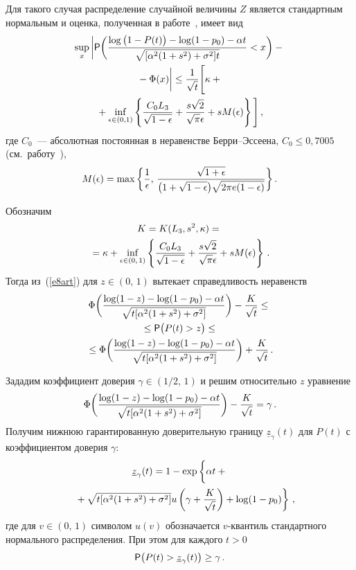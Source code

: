 \begin{multicols}{2}
Для такого случая распределение случайной величины $Z$ является
стандартным нормальным и оценка, полученная в работе~\cite{10art}, имеет
вид
\begin{multline}
\sup_x\bigg|{\sf P}\bigg(\displaystyle\frac{\displaystyle \log \big(1-P(t)\big)-\log
(1-p_0)-\alpha
t\mathstrut}{\displaystyle \sqrt{[\alpha^2(1+s^2)+\sigma^2]t}\mathstrut}<x\bigg)-{}\\
{}- \Phi(x)\bigg|\le\displaystyle\frac{\displaystyle 1\mathstrut}{\displaystyle \sqrt{t}\mathstrut}\Bigg[
\kappa+{}\\
{}+\inf_{\epsilon\in(0,1)}\left\{\displaystyle\frac{\displaystyle C_0L_3\mathstrut}{\displaystyle \sqrt{1-\epsilon}\mathstrut}+
\displaystyle\frac{\displaystyle s\sqrt{2}\mathstrut}{\displaystyle \sqrt{\pi}\epsilon\mathstrut}+sM(\epsilon)\right\}\Bigg]\,,
\label{e8art}
\end{multline}
где $C_0$~--- абсолютная постоянная в неравенстве Берри--Эссеена,
$C_0\le 0{,}7005$ (см.\ работу~\cite{11art}),
$$
M(\epsilon)=\max\bigg\{\displaystyle\frac{\displaystyle 1\mathstrut}{\displaystyle \epsilon\mathstrut},\,\displaystyle\frac{\displaystyle \sqrt{1+\epsilon}\mathstrut}{\displaystyle \big(1+\sqrt{1-\epsilon}\big)\sqrt{2\pi
e(1-\epsilon)}\mathstrut}\bigg\}\,.
$$

\smallskip

Обозначим
\begin{multline}
K=K(L_3,s^2,\kappa)={}\\
{}=\kappa+\inf_{\epsilon\in(0,\,1)}\left\{
\displaystyle\frac{\displaystyle C_0L_3\mathstrut}{\displaystyle \sqrt{1-\epsilon}\mathstrut}+
\displaystyle\frac{\displaystyle s\sqrt{2}\mathstrut}{\displaystyle \sqrt{\pi}\epsilon\mathstrut}+sM(\epsilon)\right\}\,.
\label{e9art}
\end{multline}
Тогда из~(\ref{e8art}) для $z\in(0,\,1)$ вытекает справедливость неравенств
\begin{multline*}
\Phi\bigg(\displaystyle\frac{\displaystyle \log(1-z)-\log(1-p_0)-\alpha
t\mathstrut}{\displaystyle \sqrt{t[\alpha^2(1+s^2)+\sigma^2]}\mathstrut}\bigg)-
\displaystyle\frac{\displaystyle K\mathstrut}{\displaystyle \sqrt{t}\mathstrut}\le{}\\
{}\le
{\sf P}\big(P(t)>z\big)\le{}\\
{}
\le\Phi\bigg(\displaystyle\frac{\displaystyle \log(1-z)-\log(1-p_0)-\alpha
t\mathstrut}{\displaystyle \sqrt{t[\alpha^2(1+s^2)+\sigma^2]}\mathstrut}\bigg)+\displaystyle\frac{\displaystyle K\mathstrut}{\displaystyle \sqrt{t}\mathstrut}\,.
\end{multline*}

Зададим коэффициент доверия $\gamma\in(1/2,\,1)$ и решим
относительно $z$ уравнение
$$
\Phi\bigg(\displaystyle\frac{\displaystyle \log(1-z)-\log(1-p_0)-\alpha
t\mathstrut}{\displaystyle \sqrt{t[\alpha^2(1+s^2)+\sigma^2]}\mathstrut}\bigg)-\displaystyle\frac{\displaystyle K\mathstrut}{\displaystyle \sqrt{t}\mathstrut}=\gamma\,.
$$
Получим нижнюю гарантированную доверительную границу $\underline
z_{\gamma}(t)$ для $P(t)$ с коэффициентом доверия $\gamma$:
\begin{multline*}
\underline z_{\gamma}(t)=1-\exp\left \{\vphantom{\fr{K}{\sqrt{t}}}
\alpha t+{}\right.\\
\left.{}+\sqrt{t[\alpha^2(1+s^2)+\sigma^2]}
u\left(\gamma+\fr{K}{\sqrt{t}}\right)+\log(1-p_0)\right\}\,,\hspace*{-8.64pt}
\end{multline*}
где для $v\in(0,\,1)$ символом $u(v)$ обозначается $v$-кван\-тиль
стандартного нормального распределения. При этом для каждого $t>0$
$$
{\sf P}\big(P(t)>\underline z_{\gamma}(t)\big)\ge\gamma\,.
$$


\end{multicols}
